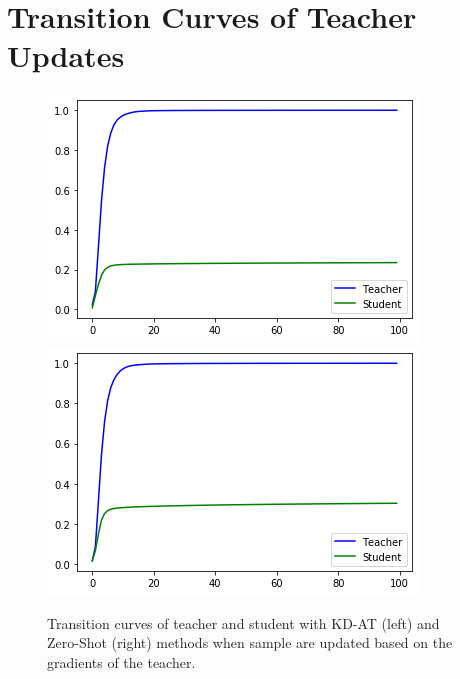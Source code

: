 \section{Transition Curves of Teacher Updates}

\begin{figure}[H]
   \centering
   \includegraphics[width=.45\linewidth]{images/KD-AT-Teacher-Train.png}
   \includegraphics[width=.45\linewidth]{images/Zero-Shot-Teacher-Train.png}
   \caption{Transition curves of teacher and student with KD-AT (left) and Zero-Shot (right) methods when sample are updated based on the gradients of the teacher.}
\end{figure}
